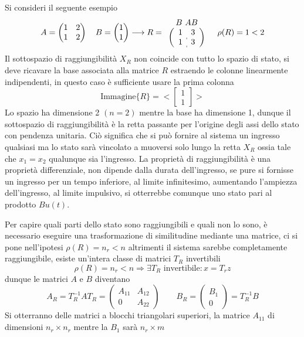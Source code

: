 Si consideri il seguente esempio
$$
A = \begin{pmatrix}
     1 & 2 \\
     1 & 2
    \end{pmatrix}
\quad B = \begin{pmatrix}
           1 \\ 1
          \end{pmatrix} \longrightarrow
R=
\begin{array}{c}
B \ AB \\
\left(\begin{array}{c:c}
    1 & 3 \\
    1 & 3
   \end{array}\right)
\end{array}\quad
\rho(R) = 1 < 2
$$
Il sottospazio di raggiungibilità $X_R$ non coincide con tutto lo spazio di
stato, si deve ricavare la base associata alla matrice $R$ estraendo le colonne
linearmente indipendenti, in questo caso è sufficiente usare la prima colonna
$$
\text{Immagine}\{R\} = <\begin{bmatrix}
                         1 \\ 1
                        \end{bmatrix}>
$$
Lo spazio ha dimensione 2 $(n=2)$ mentre la base ha dimensione 1, dunque il
sottospazio di raggiungibilità è la retta passante per l'origine degli assi
dello stato con pendenza unitaria.
Ciò significa che si può fornire al sistema un ingresso qualsiasi ma lo stato
sarà vincolato a muoversi solo lungo la retta $X_R$ ossia tale che $x_1=x_2$
qualunque sia l'ingresso.
La proprietà di raggiungibilità è una proprietà differenziale, non dipende
dalla durata dell'ingresso, se pure si fornisse un ingresso per un tempo
inferiore, al limite infinitesimo, aumentando l'ampiezza dell'ingresso, al
limite impulsivo, si otterrebbe comunque uno stato pari al prodotto $Bu(t)$.

Per capire quali parti dello stato sono raggiungibili e quali non lo sono,
è necessario eseguire una trasformazione di similitudine mediante una matrice,
ci si pone nell'ipotesi $\rho(R) = n_r<n$ altrimenti il sistema sarebbe
completamente raggiungibile, esiste un'intera classe di matrici $T_R$
invertibili
$$
\rho(R) = n_r<n \Rightarrow \exists T_R \text{ invertibile} : x=T_rz
$$
dunque le matrici $A$ e $B$ diventano
$$
A_R = T_R^{-1} A T_R = \begin{pmatrix}
                        A_{11} & A_{12} \\
                        0 & A_{22}
                       \end{pmatrix}
\qquad
B_R = \begin{pmatrix}
       B_1 \\ 0
      \end{pmatrix} = T_R^{-1}B
$$
Si otterranno delle matrici a blocchi triangolari superiori, la matrice
$A_{11}$ di dimensioni $n_r \times n_r$ mentre la $B_1$ sarà $n_r \times m$

